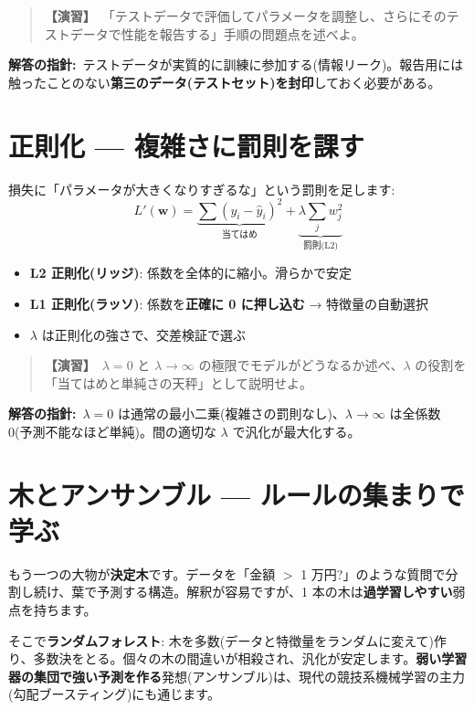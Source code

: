 \documentclass{article}
\begin{document}
\begin{quote}
\textbf{【演習】}\ 「テストデータで評価してパラメータを調整し、さらにそのテストデータで性能を報告する」手順の問題点を述べよ。
\end{quote}

\textbf{解答の指針:}\ テストデータが実質的に訓練に参加する(情報リーク)。報告用には触ったことのない\textbf{第三のデータ(テストセット)を封印}しておく必要がある。

\section{正則化 — 複雑さに罰則を課す}

損失に「パラメータが大きくなりすぎるな」という罰則を足します:
\[ L'(\boldsymbol{w}) = \underbrace{\sum (y_i - \hat{y}_i)^2}_{\text{当てはめ}} + \underbrace{\lambda \sum_j w_j^2}_{\text{罰則(L2)}} \]

\begin{itemize}
\item \textbf{L2 正則化(リッジ)}: 係数を全体的に縮小。滑らかで安定
\item \textbf{L1 正則化(ラッソ)}: 係数を\textbf{正確に 0 に押し込む} → 特徴量の自動選択
\item \(\lambda\) は正則化の強さで、交差検証で選ぶ
\end{itemize}

\begin{quote}
\textbf{【演習】}\ \(\lambda = 0\) と \(\lambda \to \infty\) の極限でモデルがどうなるか述べ、\(\lambda\) の役割を「当てはめと単純さの天秤」として説明せよ。
\end{quote}

\textbf{解答の指針:}\ \(\lambda = 0\) は通常の最小二乗(複雑さの罰則なし)、\(\lambda \to \infty\) は全係数 0(予測不能なほど単純)。間の適切な \(\lambda\) で汎化が最大化する。

\section{木とアンサンブル — ルールの集まりで学ぶ}

もう一つの大物が\textbf{決定木}です。データを「金額 $>$ 1 万円?」のような質問で分割し続け、葉で予測する構造。解釈が容易ですが、1 本の木は\textbf{過学習しやすい}弱点を持ちます。

そこで\textbf{ランダムフォレスト}: 木を多数(データと特徴量をランダムに変えて)作り、多数決をとる。個々の木の間違いが相殺され、汎化が安定します。\textbf{弱い学習器の集団で強い予測を作る}発想(アンサンブル)は、現代の競技系機械学習の主力(勾配ブースティング)にも通じます。
\end{document}
